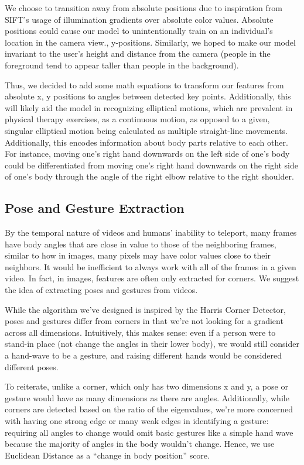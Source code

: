 \indent We choose to transition away from absolute positions due to inspiration from SIFT’s usage of illumination gradients over 
absolute color values. Absolute positions could cause our model to unintentionally train on an individual's location in the 
camera view., y-positions. Similarly, we hoped to make our model invariant to the user’s height and distance from the camera 
(people in the foreground tend to appear taller than people in the background). 

\indent Thus, we decided to add some math equations to transform our features from absolute x, y positions to angles between detected 
key points. Additionally, this will likely aid the model in recognizing elliptical motions, which are prevalent in physical 
therapy exercises, as a continuous motion, as opposed to a given, singular elliptical motion being calculated as multiple 
straight-line movements. Additionally, this encodes information about body parts relative to each other. For 
instance, moving one’s right hand downwards on the left side of one’s body could be differentiated from moving 
one’s right hand downwards on the right side of one’s body through the angle of the right elbow relative to 
the right shoulder.

\subsection{Pose and Gesture Extraction}
\indent By the temporal nature of videos and humans’ inability to teleport, many frames have body angles that are 
close in value to those of the neighboring frames, similar to how in images, many pixels may have color 
values close to their neighbors. It would be inefficient to always work with all of the frames in a given 
video. In fact, in images, features are often only extracted for corners. We suggest the idea of extracting 
poses and gestures from videos.

\indent While the algorithm we’ve designed is inspired by the Harris Corner Detector, poses and gestures differ from 
corners in that we’re not looking for a gradient across all dimensions. Intuitively, this makes sense: even 
if a person were to stand-in place (not change the angles in their lower body), we would still consider a 
hand-wave to be a gesture, and raising different hands would be considered different poses. 

\indent To reiterate, unlike a corner, which only has two dimensions x and y, a pose or gesture would have as many 
dimensions as there are angles. Additionally, while corners are detected based on the ratio of the 
eigenvalues, we’re more concerned with having one strong edge or many weak edges in identifying a gesture: 
requiring all angles to change would omit basic gestures like a simple hand wave because the majority of 
angles in the body wouldn’t change. Hence, we use Euclidean Distance as a “change in body position” score.

